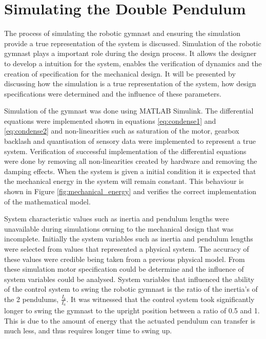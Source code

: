 \documentclass[a4paper,12pt]{article}
\begin{document}
	

	
	\section{Simulating the Double Pendulum}
	
	The process of simulating the robotic gymnast and ensuring the simulation provide a true representation of the system is discussed. Simulation of the robotic gymnast plays a important role during the design process. It allows the designer to develop a intuition for the system, enables the verification of dynamics and the creation of specification for the mechanical design. It will be presented by discussing how the simulation is a true representation of the system, how design specifications were determined and the influence of these parameters.

	Simulation of the gymnast was done using MATLAB Simulink. The differential equations were implemented shown in equations \ref{eq:condense1} and \ref{eq:condense2} and non-linearities such as saturation of the motor, gearbox backlash and quantisation of sensory data were implemented to represent a true system. Verification of successful implementation of the differential equations were done by removing all non-linearities created by hardware and removing the damping effects. When the system is given a initial condition it is expected that the mechanical energy in the system will remain constant. This behaviour is shown in Figure \ref{fig:mechanical_energy} and verifies the correct implementation of the mathematical model. 
	
	System characteristic values such as inertia and pendulum lengths were unavailable during simulations owning to the mechanical design that was incomplete. Initially the system variables such as inertia and pendulum lengths were selected from values that represented a physical system. The accuracy of these values were credible being taken from a previous physical model. From these simulation motor specification could be determine and the influence of system variables could be analysed. System variables that influenced the ability of the control system to swing the robotic gymnast is the ratio of the inertia's of the 2 pendulums, $\frac{I_{b}}{I_{a}}$. It was witnessed that the control system took significantly longer to swing the gymnast to the upright position between a ratio of 0.5 and 1. This is due to the amount of energy that the actuated pendulum can transfer is much less, and thus requires longer time to swing up.
	
\end{document}

